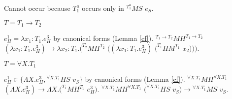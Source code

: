 \begin{case}
\begin{subcase}
Cannot occur because $T_{1}^{a}$ occurs only in $^{T_{1}^{a}}MS$ $e_{S}$.

\end{subcase}

\begin{subcase}

$T=T_{1}\rightarrow T_{2}$

$e_{H}^{1}=\lambda x_{1}:T_{1}.e_{H}^{3}$ by canonical forms (Lemma \ref{cf}).  $^{T_{1}\rightarrow T_{2}}MH^{T_{1}\rightarrow T_{2}}$ $(\lambda x_{1}:T_{1}.e_{H}^{3})\rightarrow\lambda x_{2}:T_{1}.(^{T_{2}}MH^{T_{2}}$ $((\lambda x_{1}:T_{1}.e_{H}^{3})$ $(^{T_{1}}HM^{T_{1}}$ $x_{2})))$.

\end{subcase}

\begin{subcase}

$T=\forall X.T_{1}$

$e_{H}^{1}\in\lbrace\Lambda X.e_{H}^{3},{^{\forall X.T_{1}}H}S$ $v_{S}\rbrace$ by canonical forms (Lemma \ref{cf}).  $^{\forall X.T_{1}}MH^{\forall X.T_{1}}$ $(\Lambda X.e_{H}^{3})\rightarrow\Lambda X.(^{T_{1}}MH^{T_{1}}$ $e_{H}^{3})$.  $^{\forall X.T_{1}}MH^{\forall X.T_{1}}$ $(^{\forall X.T_{1}}HS$ $v_{S})\rightarrow{^{\forall X.T_{1}}M}S$ $v_{S}$.

\end{subcase}

\end{case}